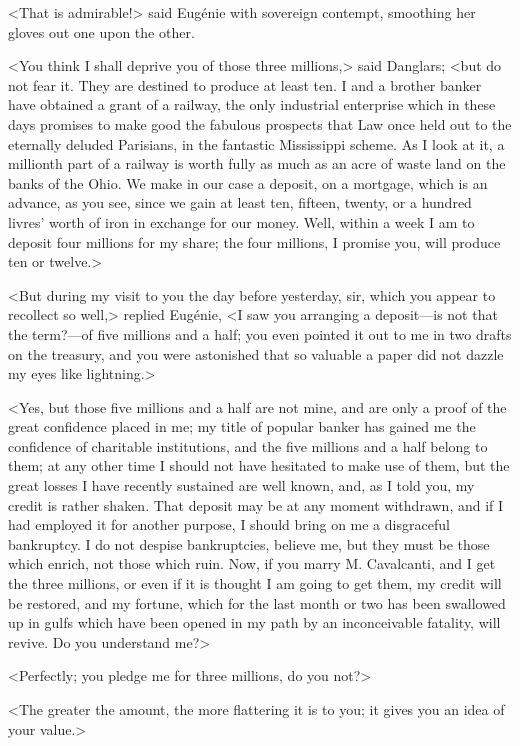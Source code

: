  <That is admirable!> said Eugénie with sovereign contempt, smoothing her gloves out one upon the other. 

 <You think I shall deprive you of those three millions,> said Danglars; <but do not fear it. They are destined to produce at least ten. I and a brother banker have obtained a grant of a railway, the only industrial enterprise which in these days promises to make good the fabulous prospects that Law once held out to the eternally deluded Parisians, in the fantastic Mississippi scheme. As I look at it, a millionth part of a railway is worth fully as much as an acre of waste land on the banks of the Ohio. We make in our case a deposit, on a mortgage, which is an advance, as you see, since we gain at least ten, fifteen, twenty, or a hundred livres' worth of iron in exchange for our money. Well, within a week I am to deposit four millions for my share; the four millions, I promise you, will produce ten or twelve.> 

 <But during my visit to you the day before yesterday, sir, which you appear to recollect so well,> replied Eugénie, <I saw you arranging a deposit—is not that the term?—of five millions and a half; you even pointed it out to me in two drafts on the treasury, and you were astonished that so valuable a paper did not dazzle my eyes like lightning.> 

 <Yes, but those five millions and a half are not mine, and are only a proof of the great confidence placed in me; my title of popular banker has gained me the confidence of charitable institutions, and the five millions and a half belong to them; at any other time I should not have hesitated to make use of them, but the great losses I have recently sustained are well known, and, as I told you, my credit is rather shaken. That deposit may be at any moment withdrawn, and if I had employed it for another purpose, I should bring on me a disgraceful bankruptcy. I do not despise bankruptcies, believe me, but they must be those which enrich, not those which ruin. Now, if you marry M. Cavalcanti, and I get the three millions, or even if it is thought I am going to get them, my credit will be restored, and my fortune, which for the last month or two has been swallowed up in gulfs which have been opened in my path by an inconceivable fatality, will revive. Do you understand me?> 

 <Perfectly; you pledge me for three millions, do you not?> 

 <The greater the amount, the more flattering it is to you; it gives you an idea of your value.> 

